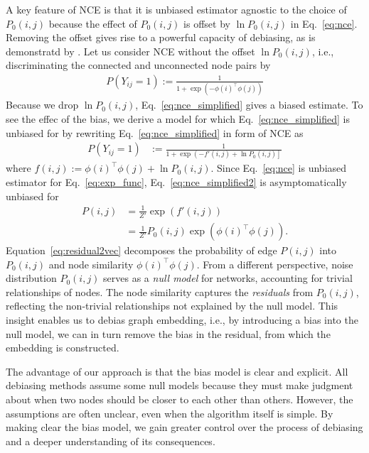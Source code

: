 \documentclass{article}
\theoremstyle{plain}
\theoremstyle{definition}
\theoremstyle{remark}
\begin{document}
A key feature of NCE is that it is unbiased estimator agnostic to the choice of $P_0(i,j)$ because the effect of $P_0(i,j)$ is offset by $\ln P_0(i,j)$ in Eq.~\eqref{eq:nce}. Removing the offset gives rise to a powerful capacity of debiasing, as is demonstratd by \cite{kojakuResidual2VecDebiasingGraph2021}.
Let us consider NCE without the offset $\ln P_0(i,j)$, i.e., discriminating the connected and unconnected node pairs by  
\begin{align}
P\left(Y_{ij} = 1\right):= \frac{1}{1 + \exp(-\phi(i) ^\top \phi(j))} 
\label{eq:nce_simplified}
\end{align}
Because we drop $\ln P_0(i,j)$, Eq.~\eqref{eq:nce_simplified} gives a biased estimate.
To see the effec of the bias, we derive a model for which Eq.~\ref{eq:nce_simplified} is unbiased for by rewriting  Eq.~\eqref{eq:nce_simplified} in form of NCE as 
\begin{align}
P\left(Y_{ij} = 1\right) &:= \frac{1}{1 + \exp\left(-f'(i,j)+ \ln P_0(i,j)\right]}
\label{eq:nce_simplified2}
\end{align}
where $f(i,j):=\phi(i) ^\top \phi(j) + \ln P_0(i,j)$. Since Eq.~\eqref{eq:nce} is unbiased estimator for Eq.~\eqref{eq:exp_func}, Eq.~\eqref{eq:nce_simplified2} is asymptomatically unbiased for 
\begin{align}
P(i,j) &= \frac{1}{Z'}\exp(f'(i,j)) \nonumber \\
       &= \frac{1}{Z'}P_0(i,j)\exp(\phi(i) ^\top \phi(j)).
\label{eq:residual2vec}
\end{align}
Equation~\eqref{eq:residual2vec} decomposes the probability of edge $P(i,j)$ into $P_0(i,j)$ and node similarity $\phi(i) ^\top \phi(j)$. From a different perspective, noise distribution $P_0(i,j)$ serves as a \textit{null model} for networks, accounting for trivial relationships of nodes. The node similarity captures the \textit{residuals} from $P_0(i,j)$, reflecting the non-trivial relationships not explained by the null model.
This insight enables us to debias graph embedding, i.e., by introducing a bias into the null model, we can in turn remove the bias in the residual, from which the embedding is constructed. 

The advantage of our approach is that the bias model is clear and explicit. 
All debiasing methods assume some null models because they must make judgment about when two nodes should be closer to each other than others.
However, the assumptions are often unclear, even when the algorithm itself is simple. 
By making clear the bias model, we gain greater control over the process of debiasing and a deeper understanding of its consequences. 
\end{document}
